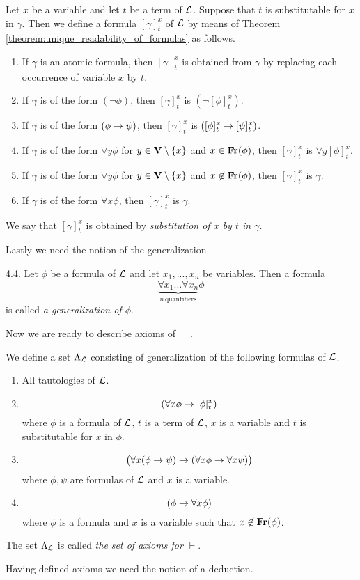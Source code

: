 \begin{definition}
Let $x$ be a variable and let $t$ be a term of ${\mathcal L}$. Suppose that $t$ is substitutable for $x$ in $\gamma$. Then we define a formula $[\gamma]^x_t$ of ${\mathcal L}$ by means of Theorem \ref{theorem:unique_readability_of_formulas} as follows.
\begin{enumerate}[label=\textbf{(\arabic*)}, leftmargin=3.0em]
\item If $\gamma$ is an atomic formula, then $[\gamma]^x_t$ is obtained from $\gamma$ by replacing each occurrence of variable $x$ by $t$.
\item If $\gamma$ is of the form $(\neg \phi)$, then $[\gamma]^x_t$ is $(\neg [\phi]^x_t)$.
\item If $\gamma$ is of the form $(\phi \rightarrow \psi)$, then $[\gamma]^x_t$ is $([\phi]^x_t \rightarrow [\psi]^x_t)$.
\item If $\gamma$ is of the form $\forall y \phi$ for $y \in \mathbf{V}\setminus \{x\}$ and $x\in \mathbf{Fr}(\phi)$, then $[\gamma]^x_t$ is $\forall y [\phi]^x_t$.
\item If $\gamma$ is of the form $\forall y \phi$ for $y \in \mathbf{V}\setminus \{x\}$ and $x\not \in \mathbf{Fr}(\phi)$, then $[\gamma]^x_t$ is $\gamma$.
\item If $\gamma$ is of the form $\forall x\phi$, then $[\gamma]^x_t$ is $\gamma$.
\end{enumerate}
We say that $[\gamma]^x_t$ is obtained by \textit{substitution of $x$ by $t$ in $\gamma$}.
\end{definition}
\noindent
Lastly we need the notion of the generalization.

\begin{definition} 4.4. Let $\phi$ be a formula of ${\mathcal L}$ and let $x_1,...,x_n$ be variables. Then a formula
$$\underbrace{\forall x_1 ...\forall x_n}_{n\,\mathrm{quantifiers}} \phi$$
is called \textit{a generalization of $\phi$}.
\end{definition}
\noindent
Now we are ready to describe axioms of $\vdash$.

\begin{definition}
We define a set $\Lambda_{{\mathcal L}}$ consisting of generalization of the following formulas of ${\mathcal L}$.
\begin{enumerate}[label=\textbf{(\arabic*)}, leftmargin=3.0em]
\item All tautologies of ${\mathcal L}$.
\item
$$\left(\forall x\phi \rightarrow [\phi]^x_t\right)$$
where $\phi$ is a formula of ${\mathcal L}$, $t$ is a term of ${\mathcal L}$, $x$ is a variable and $t$ is substitutable for $x$ in $\phi$.
\item
$$\big(\forall x(\phi \rightarrow \psi) \rightarrow (\forall x\phi \rightarrow \forall x\psi)\big)$$
where $\phi, \psi$ are formulas of ${\mathcal L}$ and $x$ is a variable.
\item
$$(\phi \rightarrow \forall x\phi)$$
where $\phi$ is a formula and $x$ is a variable such that $x \not \in \mathbf{Fr}(\phi)$.
\end{enumerate}
The set $\Lambda_{\mathcal L}$ is called \textit{the set of axioms for $\vdash$}.
\end{definition}
\noindent
Having defined axioms we need the notion of a deduction.

